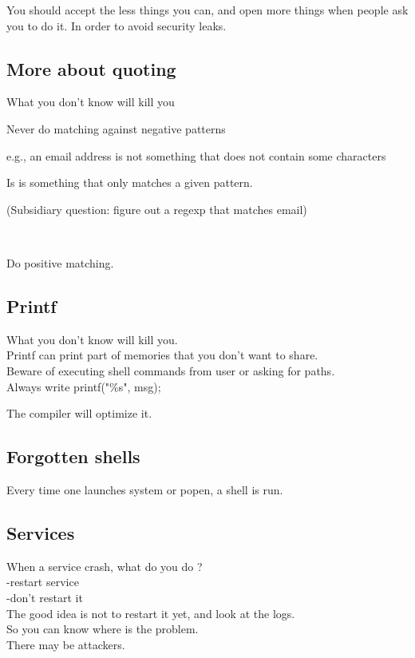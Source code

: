 \documentclass[a4paper,11pt]{article}
\begin{document}
You should accept the less things you can, and open more things when people ask you to do it. In order to avoid security leaks.

\subsection{More about quoting}

What you don't know will kill you

Never do matching against negative patterns

e.g., an email address is not something that does not contain some characters

Is is something that only matches a given pattern.

(Subsidiary question: figure out a regexp that matches email)

\

Do positive matching.

\subsection{Printf}
What you don't know will kill you.\\
Printf can print part of memories that you don't want to share.\\
Beware of executing shell commands from user or asking for paths.\\

Always write printf("\%s", msg);

The compiler will optimize it.

\subsection{Forgotten shells}

Every time one launches system or popen, a shell is run.

\subsection{Services}
When a service crash, what do you do ?\\
-restart service\\
-don't restart it\\

The good idea is not to restart it yet, and look at the logs.\\
So you can know where is the problem.\\
There may be attackers.\\
\end{document}
